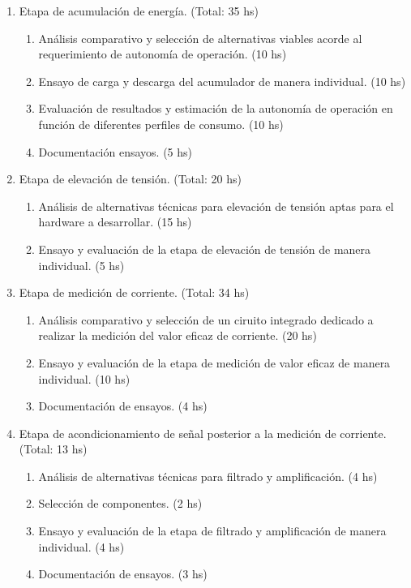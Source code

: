 \documentclass[11pt]{charter}
\begin{document}
\begin{enumerate}
\begin{enumerate}
		 \item Etapa de acumulación de energía. (Total: 35 hs)
			 \begin{enumerate}[label*=\arabic*.]
			 	\item Análisis comparativo y selección de alternativas viables acorde al requerimiento de autonomía de operación. (10 hs)
			 	\item Ensayo de carga y descarga del acumulador de manera individual. (10 hs)
			 	\item Evaluación de resultados y estimación de la autonomía de operación en función de diferentes perfiles de consumo. (10 hs)
			 	\item Documentación ensayos. (5 hs)
			 \end{enumerate}
			 
		 \item Etapa de elevación de tensión. (Total: 20 hs)
			 \begin{enumerate}[label*=\arabic*.]
			 	\item Análisis de alternativas técnicas para elevación de tensión aptas para el hardware a desarrollar. (15 hs)
			 	\item Ensayo y evaluación de la etapa de elevación de tensión de manera individual. (5 hs)
			 \end{enumerate}

		 \item Etapa de medición de corriente. (Total: 34 hs)
			 \begin{enumerate}[label*=\arabic*.]
			 	\item Análisis comparativo y selección de un ciruito integrado dedicado a realizar la medición del valor eficaz de corriente. (20 hs)
			 	\item Ensayo y evaluación de la etapa de medición de valor eficaz de manera individual. (10 hs)
			 	\item Documentación de ensayos. (4 hs)
			 \end{enumerate}
			 
		 \item Etapa de acondicionamiento de señal posterior a la medición de corriente. (Total: 13 hs)
			 \begin{enumerate}[label*=\arabic*.]
			 	\item Análisis de alternativas técnicas para filtrado y amplificación. (4 hs)
			 	\item Selección de componentes. (2 hs)
			 	\item Ensayo y evaluación de la etapa de filtrado y amplificación de manera individual. (4 hs)
			 	\item Documentación de ensayos. (3 hs)
			 \end{enumerate}
			 

\end{enumerate}
\end{enumerate}
\end{document}
